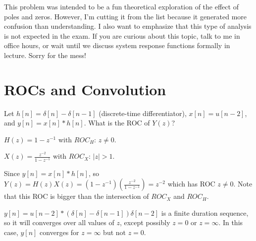 \documentclass[11pt]{article}
\begin{document}
%
%
%
%
%
%
{\color{red}
This problem was intended to be a fun theoretical exploration of the effect of poles and zeros. However, I'm cutting it from the list because it generated more confusion than understanding. I also want to emphasize that this type of analysis is not expected in the exam. If you are curious about this topic, talk to me in office hours, or wait until we discuss system response functions formally in lecture. Sorry for the mess!

}

\section{ROCs and Convolution}

Let $h[n]=\delta[n]-\delta[n-1]$ (discrete-time differentiator), $x[n]=u[n-2]$, and $y[n]=x[n]*h[n]$. What is the ROC of $Y(z)$?

{\color{blue}
$H(z) = 1-z^{-1}$ with $ROC_H$: $z \neq 0$.

$X(z) = \frac{z^{-2}}{1-z^{-1}}$ with $ROC_X$: $|z|>1$.

Since $y[n]=x[n]*h[n]$, so $Y(z)=H(z)X(z)=\left(1-z^{-1} \right)\left( \frac{z^{-2}}{1-z^{-1}} \right) = z^{-2}$ which has ROC $z \neq 0$. Note that this ROC is bigger than the intersection of $ROC_X$ and $ROC_H$.

$y[n] = u[n-2]* \left(\delta[n]-\delta[n-1]\right) \delta[n-2]$ is a finite duration sequence, so it will converges over all values of $z$, except possibly $z=0$ or $z=\infty$. In this case, $y[n]$ converges for $z=\infty$ but not $z=0$.
}
\end{document}
